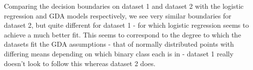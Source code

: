 \begin{answer}
	Comparing the decision boundaries on dataset 1 and dataset 2 with the logistic regression and GDA models respectively, we see very similar boundaries for dataset 2, but quite different for dataset 1 - for which logistic regression seems to achieve a much better fit. This seems to correspond to the degree to which the datasets fit the GDA assumptions - that of normally distributed points with differing means depending on which binary class each is in - dataset 1 really doesn't look to follow this whereas dataset 2 does.
\end{answer}
